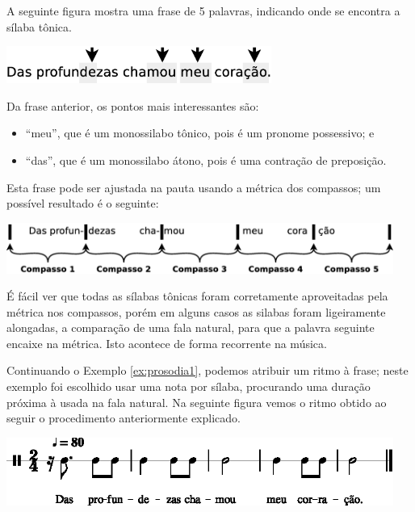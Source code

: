 
\begin{example}
\label{ex:prosodia1}
A seguinte figura mostra uma frase de 5 palavras, indicando onde se encontra a sílaba tônica.
\begin{center}
\includegraphics[width=0.65\textwidth]{chapters/cap-musica-topicos/prosodia1.eps}
\end{center}
Da frase anterior, os pontos mais interessantes são:
\begin{itemize}
\item ``meu'', que é um monossilabo tônico, pois é um pronome possessivo; e
\item ``das'', que é um monossilabo átono, pois é uma contração de preposição.
\end{itemize}
Esta frase pode ser ajustada na pauta usando a métrica dos compassos;
um possível resultado é o seguinte:
\begin{center}
\includegraphics[width=0.95\textwidth]{chapters/cap-musica-topicos/prosodia2.eps}
\end{center}
É fácil ver que todas as sílabas tônicas foram corretamente 
aproveitadas pela métrica nos compassos,
porém em alguns casos as silabas foram ligeiramente alongadas, a comparação de uma fala natural,
para que a palavra seguinte encaixe na métrica.
Isto acontece de forma recorrente na música. 
\end{example}

\begin{example}
\label{ex:prosodia2}
Continuando o Exemplo \ref{ex:prosodia1}, podemos atribuir um ritmo à frase; 
neste exemplo foi escolhido usar uma nota por sílaba, 
procurando uma duração próxima à usada na fala natural.
Na seguinte figura vemos o ritmo obtido ao seguir o procedimento anteriormente explicado. 
\begin{center}
\includegraphics[width=0.95\textwidth]{chapters/cap-musica-topicos/frase5a-1.eps}
\end{center}
\end{example}

